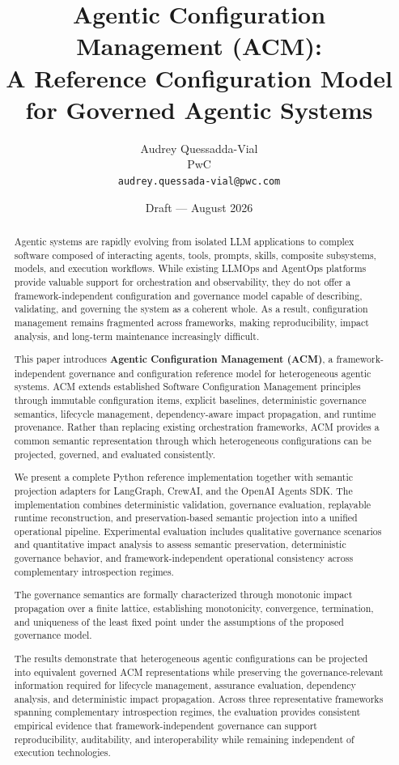 \documentclass[10pt]{article}
\title{\textbf{Agentic Configuration Management (ACM):\\A Reference Configuration Model for Governed Agentic Systems}}
\author{
  Audrey Quessadda-Vial\\
  PwC\\
  \texttt{audrey.quessada-vial@pwc.com}
}
\date{Draft --- August 2026}
\begin{document}
\maketitle

\begin{abstract}

Agentic systems are rapidly evolving from isolated LLM applications to complex software composed of interacting agents, tools, prompts, skills, composite subsystems, models, and execution workflows. While existing LLMOps and AgentOps platforms provide valuable support for orchestration and observability, they do not offer a framework-independent configuration and governance model capable of describing, validating, and governing the system as a coherent whole. As a result, configuration management remains fragmented across frameworks, making reproducibility, impact analysis, and long-term maintenance increasingly difficult.

This paper introduces \textbf{Agentic Configuration Management (ACM)}, a framework-independent governance and configuration reference model for heterogeneous agentic systems. ACM extends established Software Configuration Management principles through immutable configuration items, explicit baselines, deterministic governance semantics, lifecycle management, dependency-aware impact propagation, and runtime provenance. Rather than replacing existing orchestration frameworks, ACM provides a common semantic representation through which heterogeneous configurations can be projected, governed, and evaluated consistently.

We present a complete Python reference implementation together with semantic projection adapters for LangGraph, CrewAI, and the OpenAI Agents SDK. The implementation combines deterministic validation, governance evaluation, replayable runtime reconstruction, and preservation-based semantic projection into a unified operational pipeline. Experimental evaluation includes qualitative governance scenarios and quantitative impact analysis to assess semantic preservation, deterministic governance behavior, and framework-independent operational consistency across complementary introspection regimes.

The governance semantics are formally characterized through monotonic impact propagation over a finite lattice, establishing monotonicity, convergence, termination, and uniqueness of the least fixed point under the assumptions of the proposed governance model.

The results demonstrate that heterogeneous agentic configurations can be projected into equivalent governed ACM representations while preserving the governance-relevant information required for lifecycle management, assurance evaluation, dependency analysis, and deterministic impact propagation. Across three representative frameworks spanning complementary introspection regimes, the evaluation provides consistent empirical evidence that framework-independent governance can support reproducibility, auditability, and interoperability while remaining independent of execution technologies.

\end{abstract}
\end{document}
